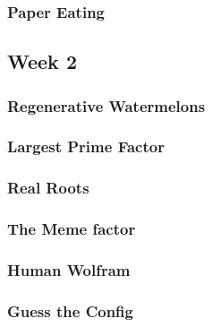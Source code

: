\documentclass[titlepage=true]{scrartcl}
\begin{document}
        \subsubsection{Paper Eating}
            \label{1-1-7}
            
        \newpage
        
\subsection{Week 2}

        \subsubsection{Regenerative Watermelons}
            \label{1-2-1}
            
        \newpage 

        \subsubsection{Largest Prime Factor}
            \label{1-2-2}       
            
        \newpage

        \subsubsection{Real Roots}
            \label{1-2-3}
            
        \newpage 

        \subsubsection{The Meme factor}
            \label{1-2-4}
            
        \newpage

        \subsubsection{Human Wolfram}
            \label{1-2-5}
            
        \newpage 

        \subsubsection{Guess the Config}
            \label{1-2-6}
            
        \newpage 
        
\end{document}
